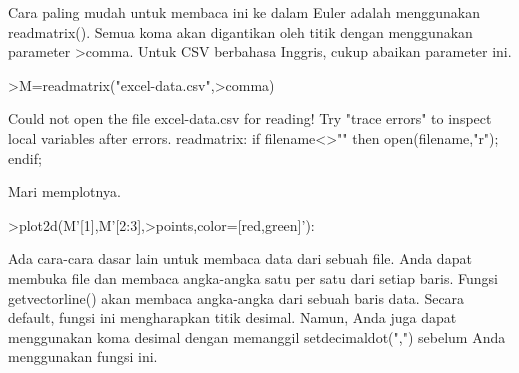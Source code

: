 \documentclass[a4paper,10pt]{article}
\begin{document}
\begin{eulernotebook}
\begin{eulercomment}
\begin{eulercomment}
\begin{eulercomment}
\begin{eulercomment}
\begin{eulercomment}
\begin{eulercomment}
\begin{eulercomment}
Cara paling mudah untuk membaca ini ke dalam Euler adalah menggunakan
readmatrix(). Semua koma akan digantikan oleh titik dengan menggunakan
parameter \textgreater{}comma. Untuk CSV berbahasa Inggris, cukup abaikan parameter
ini.
\end{eulercomment}
\begin{eulerprompt}
>M=readmatrix("excel-data.csv",>comma)
\end{eulerprompt}
\begin{euleroutput}
  Could not open the file
  excel-data.csv
  for reading!
  Try "trace errors" to inspect local variables after errors.
  readmatrix:
      if filename<>"" then open(filename,"r"); endif;
\end{euleroutput}
\begin{eulercomment}
Mari memplotnya.
\end{eulercomment}
\begin{eulerprompt}
>plot2d(M'[1],M'[2:3],>points,color=[red,green]'):
\end{eulerprompt}
\begin{eulercomment}
Ada cara-cara dasar lain untuk membaca data dari sebuah file. Anda
dapat membuka file dan membaca angka-angka satu per satu dari setiap
baris. Fungsi getvectorline() akan membaca angka-angka dari sebuah
baris data. Secara default, fungsi ini mengharapkan titik desimal.
Namun, Anda juga dapat menggunakan koma desimal dengan memanggil
setdecimaldot(",") sebelum Anda menggunakan fungsi ini.


\end{eulercomment}
\end{eulercomment}
\end{eulercomment}
\end{eulercomment}
\end{eulercomment}
\end{eulercomment}
\end{eulercomment}
\end{eulernotebook}
\end{document}
